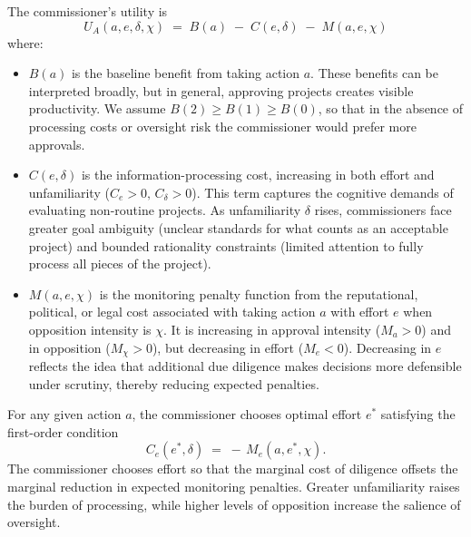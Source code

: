 The commissioner's utility is
\begin{equation}
    U_A(a,e,\delta,\chi) \;=\; B(a) \;-\; C(e,\delta) \;-\; M(a,e,\chi)
    \label{eq:agentutility}
\end{equation}
where:
\begin{itemize}
    \item $B(a)$ is the baseline benefit from taking action $a$. These benefits can be interpreted broadly, but in general, approving projects creates visible productivity. We assume $B(2)\geq B(1)\geq B(0)$, so that in the absence of processing costs or oversight risk the commissioner would prefer more approvals.
    \item $C(e,\delta)$ is the information-processing cost, increasing in both effort and unfamiliarity ($C_e > 0,\, C_\delta > 0$). This term captures the cognitive demands of evaluating non-routine projects. As unfamiliarity $\delta$ rises, commissioners face greater goal ambiguity (unclear standards for what counts as an acceptable project) and bounded rationality constraints (limited attention to fully process all pieces of the project). 
    \item $M(a,e,\chi)$ is the monitoring penalty function from the reputational, political, or legal cost associated with taking action $a$ with effort $e$ when opposition intensity is $\chi$. It is increasing in approval intensity ($M_a > 0$) and in opposition ($M_\chi > 0$), but decreasing in effort ($M_e < 0$). Decreasing in $e$ reflects the idea that additional due diligence makes decisions more defensible under scrutiny, thereby reducing expected penalties.
\end{itemize}

For any given action $a$, the commissioner chooses optimal effort $e^*$ satisfying the first-order condition
\begin{equation}
    C_{e}(e^*,\delta) \;=\; -\, M_{e}(a,e^*,\chi).
    \label{eq:effortFOC}
\end{equation}
The commissioner chooses effort so that the marginal cost of diligence offsets the marginal reduction in expected monitoring penalties. Greater unfamiliarity raises the burden of processing, while higher levels of opposition increase the salience of oversight.

